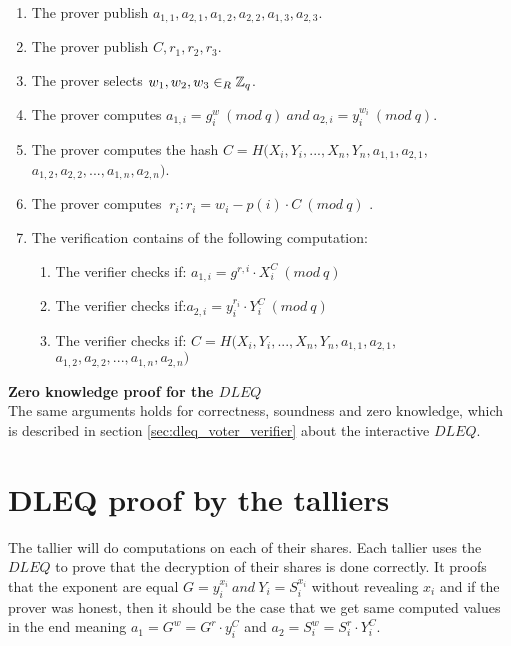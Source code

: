 \begin{enumerate}
    \item The prover publish $a_{1,1},a_{2,1},a_{1,2},a_{2,2},a_{1,3},a_{2,3}$.
    \item The prover publish $C,r_1,r_2,r_3$.
    \item The prover selects  $w_1, w_2,w_3\in_R \mathbb{Z}_q$.
    \item The prover computes $a_{1,i}=g^w_i \ (mod\ q) \ and \ a_{2,i}=y_i^{w_i} \ (mod\ q)$.
    \item The prover computes the hash  $C=H(X_i,Y_i,...,X_n,Y_n,a_{1,1},a_{2,1},$\\
$a_{1,2},a_{2,2},...,a_{1,n},a_{2,n})$.
    \item The prover computes $\ r_i:  r_i=w_i-p(i)  \cdot  C \ (mod\ q)$ .
    \item The verification contains of the following computation:
    \begin{enumerate}        
        \item The verifier checks if: $a_{1,i} = g^{r,i} \cdot X_i^C \ (mod\ q) $
        \item The verifier checks if:$a_{2,i} =y_i^{r_{i}}  \cdot  Y_i^C \ (mod\ q)  $ 
         \item The verifier checks if: $C=H(X_i,Y_i,...,X_n,Y_n,a_{1,1},a_{2,1},$\\
$a_{1,2},a_{2,2},...,a_{1,n},a_{2,n})$
    \end{enumerate}
\end{enumerate}



\noindent
\textbf{Zero knowledge proof for the $DLEQ$}\\
The same arguments holds for correctness, soundness and zero knowledge, which is described in section \ref{sec:dleq_voter_verifier} about the interactive $DLEQ$. 



\section{DLEQ proof by the talliers}
\label{sec:dleq_proof_by_the_talliers}
The tallier will do computations on each of their shares. Each tallier uses the $DLEQ$ to prove that the decryption of their shares is done correctly. It proofs that the exponent are equal \begin{math}G = y_i^{x_i}  \ and \ Y_i=S_i^{x_i} \end{math} without revealing \begin{math}x_i \end{math} and if the prover was honest, then it should be the case that we get same computed values in the end meaning \begin{math}a_1=G^w = G^r \cdot y_i^C\end{math} and \begin{math}a_2=S_i^w = S_i^r \cdot Y_i^C\end{math}.\\

